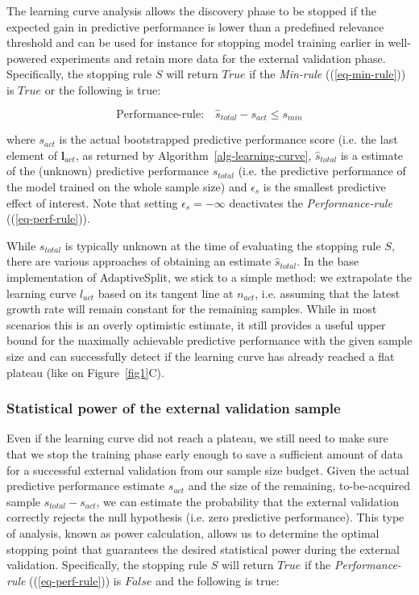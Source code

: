 \documentclass{article}
\begin{document}
The learning curve analysis allows the discovery phase to be stopped if the expected gain in predictive performance is lower than a predefined relevance threshold and can be used for instance for stopping model training earlier in well-powered experiments and retain more data for the external validation phase. Specifically, the stopping rule $S$ will return $True$ if the \textit{Min-rule} ((\ref{eq-min-rule})) is $True$ or the following is true:

\begin{equation}
\label{eq-perf-rule}
    \text{Performance-rule:} \quad \hat{s}_{total} - s_{act} \leq s_{min}
\end{equation}

where $s_{act}$ is the actual bootstrapped predictive performance score (i.e. the last element of $\textbf{l}_{act}$, as returned by Algorithm~\ref{alg-learning-curve}, $\hat{s}_{total}$ is a estimate of the (unknown) predictive performance $s_{total}$ (i.e. the predictive performance of the model trained on the whole sample size) and $\epsilon_{s}$ is the smallest predictive effect of interest. Note that setting $\epsilon_{s} = -\infty$ deactivates the \textit{Performance-rule} ((\ref{eq-perf-rule})).

While $s_{total}$ is typically unknown at the time of evaluating the stopping rule $S$, there are various approaches of obtaining an estimate $\hat{s}_{total}$. In the base implementation of AdaptiveSplit, we stick to a simple method: we extrapolate the learning curve $l_{act}$ based on its tangent line at $n_{act}$, i.e. assuming that the latest growth rate will remain constant for the remaining samples. While in most scenarios this is an overly optimistic estimate, it still provides a useful upper bound for the maximally achievable predictive performance with the given sample size and can successfully detect if the learning curve has already reached a flat plateau (like on Figure~\ref{fig1}C).

\subsubsection{\textbf{Statistical power of the external validation sample}}

Even if the learning curve did not reach a plateau, we still need to make sure that we stop the training phase early enough to save a sufficient amount of data for a successful external validation from our sample size budget. Given the actual predictive performance estimate $s_{act}$ and the size of the remaining, to-be-acquired sample $s_{total} - s_{act}$, we can estimate the probability that the external validation correctly rejects the null hypothesis (i.e. zero predictive performance).
This type of analysis, known as power calculation, allows us to determine the optimal stopping point that guarantees the desired statistical power during the external validation.
Specifically, the stopping rule $S$ will return $True$ if the \textit{Performance-rule} ((\ref{eq-perf-rule})) is $False$ and the following is true:
\end{document}
